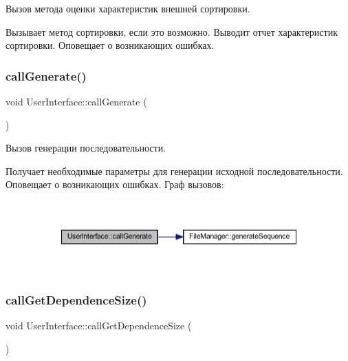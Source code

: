 Вызов метода оценки характеристик внешней сортировки. 

Вызывает метод сортировки, если это возможно. Выводит отчет характеристик сортировки. Оповещает о возникающих ошибках. \hypertarget{class_user_interface_a27c547dadfd5588d5b734e253b2e8a4a}{}\label{class_user_interface_a27c547dadfd5588d5b734e253b2e8a4a} 
\subsubsection{\texorpdfstring{call\+Generate()}{callGenerate()}}
{\footnotesize\ttfamily void User\+Interface\+::call\+Generate (\begin{DoxyParamCaption}{ }\end{DoxyParamCaption})\hspace{0.3cm}{\ttfamily [private]}}



Вызов генерации последовательности. 

Получает необходимые параметры для генерации исходной последовательности. Оповещает о возникающих ошибках. Граф вызовов\+:\nopagebreak
\begin{figure}[H]
\begin{center}
\leavevmode
\includegraphics[width=350pt]{class_user_interface_a27c547dadfd5588d5b734e253b2e8a4a_cgraph}
\end{center}
\end{figure}
\hypertarget{class_user_interface_a1dc307f92c919866f13ddaf30cde1a70}{}\label{class_user_interface_a1dc307f92c919866f13ddaf30cde1a70} 
\subsubsection{\texorpdfstring{call\+Get\+Dependence\+Size()}{callGetDependenceSize()}}
{\footnotesize\ttfamily void User\+Interface\+::call\+Get\+Dependence\+Size (\begin{DoxyParamCaption}{ }\end{DoxyParamCaption})\hspace{0.3cm}{\ttfamily [private]}}



